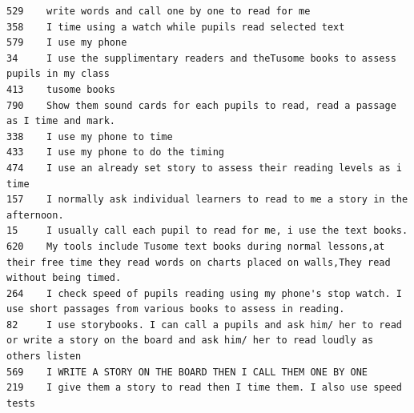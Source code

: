 \documentclass[11pt]{article}
\begin{document}
    \begin{Verbatim}[commandchars=\\\{\}]
529    write words and call one by one to read for me                                                                                                             
358    I time using a watch while pupils read selected text                                                                                                       
579    I use my phone                                                                                                                                             
34     I use the supplimentary readers and theTusome books to assess pupils in my class                                                                           
413    tusome books                                                                                                                                               
790    Show them sound cards for each pupils to read, read a passage as I time and mark.                                                                          
338    I use my phone to time                                                                                                                                     
433    I use my phone to do the timing                                                                                                                            
474    I use an already set story to assess their reading levels as i time                                                                                        
157    I normally ask individual learners to read to me a story in the afternoon.                                                                                 
15     I usually call each pupil to read for me, i use the text books.                                                                                            
620    My tools include Tusome text books during normal lessons,at their free time they read words on charts placed on walls,They read without being timed.       
264    I check speed of pupils reading using my phone's stop watch. I use short passages from various books to assess in reading.                                 
82     I use storybooks. I can call a pupils and ask him/ her to read or write a story on the board and ask him/ her to read loudly as others listen              
569    I WRITE A STORY ON THE BOARD THEN I CALL THEM ONE BY ONE                                                                                                   
219    I give them a story to read then I time them. I also use speed tests                                                                                       

\end{Verbatim}
\end{document}
